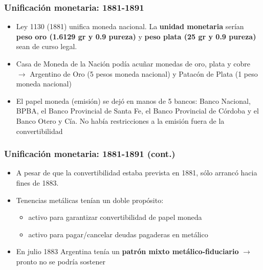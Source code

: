 \documentclass[14pt,aspectratio=169]{beamer}
\begin{document}
  
  
\begin{frame}\frametitle{Unificación monetaria: 1881-1891}
     \begin{itemize}
     \item Ley 1130 (1881) unifica moneda
       nacional. La \textbf{unidad
         monetaria} serían \textbf{peso oro (1.6129 gr y 0.9 pureza)} y \textbf{peso
         plata (25 gr y 0.9 pureza)} sean de curso legal.
       \item Casa de Moneda de la Nación podía acuñar monedas de oro,
         plata y cobre $\longrightarrow$ Argentino de Oro (5 pesos
         moneda nacional) y Patacón de Plata (1 peso moneda nacional)
       \item El papel moneda (emisión) se
         dejó en manos de 5 bancos: Banco Nacional, BPBA, el Banco Provincial de Santa
         Fe, el Banco Provincial de Córdoba y el Banco Otero y Cía. No había restricciones a la emisión fuera de la convertibilidad
         \end{itemize}
        \end{frame}


\begin{frame}\frametitle{Unificación monetaria: 1881-1891 (cont.)}
     \begin{itemize}
     \item A pesar de que la convertibilidad estaba prevista en 1881,
       sólo arrancó hacia fines de 1883.  
     \item  Tenencias metálicas tenían un doble propósito:
       \begin{itemize}\itemsep 10pt \medskip
       \item activo para garantizar convertibilidad de papel moneda
       \item activo para pagar/cancelar deudas pagaderas en metálico
       \end{itemize}
       \item En julio 1883 Argentina tenía un \textbf{patrón mixto
           metálico-fiduciario} $\longrightarrow$ pronto no se podría sostener
         \end{itemize}
        \end{frame}

        
\end{document}
